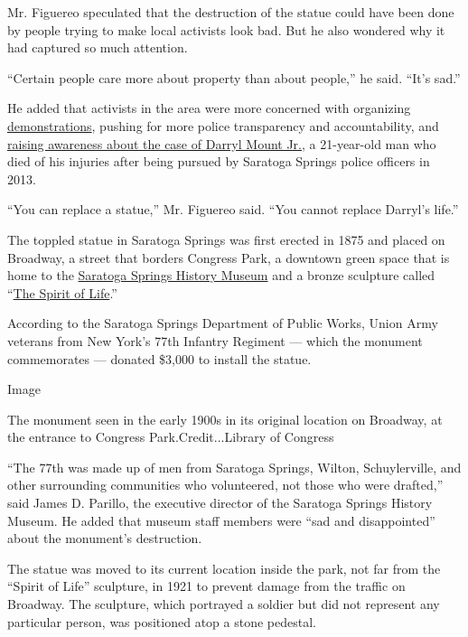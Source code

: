 Mr. Figuereo speculated that the destruction of the statue could have
been done by people trying to make local activists look bad. But he also
wondered why it had captured so much attention.

``Certain people care more about property than about people,'' he said.
``It's sad.''

He added that activists in the area were more concerned with organizing
\href{https://dailygazette.com/galleries/2020/07/01/all-us-protestors-march-streets-saratoga-springs}{demonstrations},
pushing for more police transparency and accountability, and
\href{https://www.timesunion.com/news/article/A-death-in-Saratoga-but-no-internal-probe-13174766.php}{raising
awareness about the case of Darryl Mount Jr.}, a 21-year-old man who
died of his injuries after being pursued by Saratoga Springs police
officers in 2013.

``You can replace a statue,'' Mr. Figuereo said. ``You cannot replace
Darryl's life.''

The toppled statue in Saratoga Springs was first erected in 1875 and
placed on Broadway, a street that borders Congress Park, a downtown
green space that is home to the
\href{https://www.saratogahistory.org/}{Saratoga Springs History Museum}
and a bronze sculpture called
``\href{https://timesmachine.nytimes3xbfgragh.onion/timesmachine/1915/06/27/301807212.html?pageNumber=20}{The
Spirit of Life}.''

According to the Saratoga Springs Department of Public Works, Union Army
veterans from New York's 77th Infantry Regiment --- which the monument
commemorates --- donated \$3,000 to install the statue.

Image

The monument seen in the early 1900s in its original location on
Broadway, at the entrance to Congress Park.Credit...Library of Congress

``The 77th was made up of men from Saratoga Springs, Wilton,
Schuylerville, and other surrounding communities who volunteered, not
those who were drafted,'' said James D. Parillo, the executive director
of the Saratoga Springs History Museum. He added that museum staff
members were ``sad and disappointed'' about the monument's destruction.

The statue was moved to its current location inside the park, not far
from the ``Spirit of Life'' sculpture, in 1921 to prevent damage from
the traffic on Broadway. The sculpture, which portrayed a soldier but
did not represent any particular person, was positioned atop a stone
pedestal.

